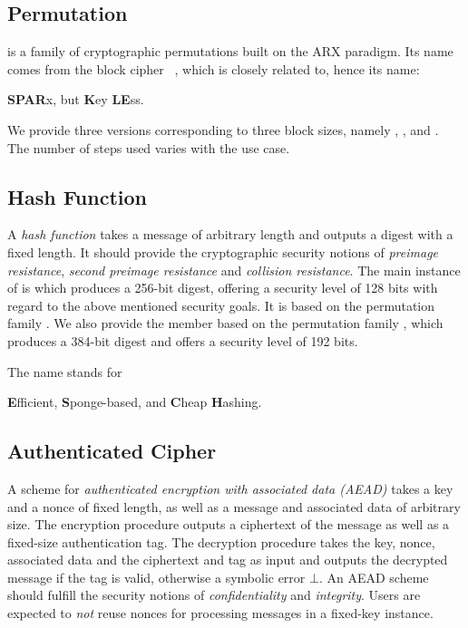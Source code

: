 \subsection*{Permutation \aCipher{}}

\aCipher{} is a family of cryptographic permutations built on the ARX paradigm. Its name comes from the block cipher \sparx{}~\cite{OurSPARX}, which \aCipher{} is closely related to, hence its name:
\begin{center}
  \textbf{SPAR}x, but \textbf{K}ey \textbf{LE}ss.
\end{center}

We provide three versions corresponding to three block sizes, namely , , and . The number of steps used varies with the use case.


\subsection*{Hash Function \hash{}}

A \emph{hash function} takes a message of arbitrary length and outputs a digest with a fixed length. It should provide the cryptographic security notions of \emph{preimage resistance}, \emph{second preimage resistance} and \emph{collision resistance}. 
The main instance of \hash{} is  which produces a 256-bit digest, offering a security level of 128 bits with regard to the above mentioned security goals. It is based on the permutation family .  We also provide the member  based on the permutation family , which produces a 384-bit digest and offers a security level of 192 bits.

The name \hash{} stands for
\begin{center}
  \textbf{E}fficient, \textbf{S}ponge-based, and \textbf{C}heap \textbf{H}ashing.
\end{center}


\subsection*{Authenticated Cipher \aead{}}

A scheme for \emph{authenticated encryption with associated data (AEAD)} takes a key and a nonce of fixed length, as well as a message and associated data of arbitrary size. The encryption procedure outputs a ciphertext of the message as well as a fixed-size authentication tag. The decryption procedure takes the key, nonce, associated data and the ciphertext and tag as input and outputs the decrypted message if the tag is valid, otherwise a symbolic error $\bot$.
An AEAD scheme should fulfill the security notions of \emph{confidentiality} and \emph{integrity}. Users are expected to \emph{not} reuse nonces for processing messages in a fixed-key instance.


